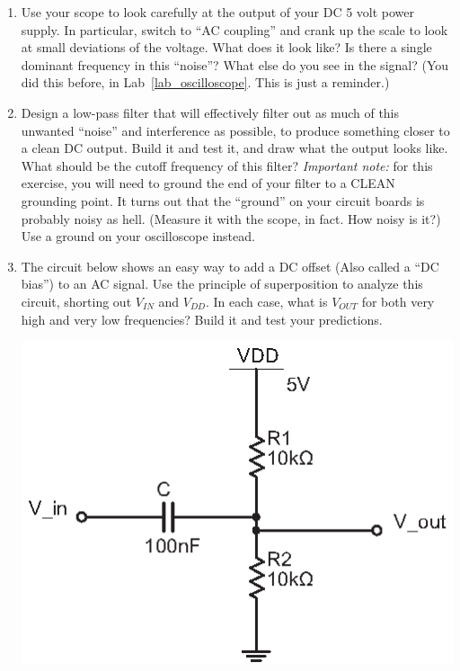 \begin{enumerate}[wide]
\item Use your scope to look carefully at the output of your DC 5 volt power supply.  In particular, switch to ``AC coupling'' and crank up the scale to look at small deviations of the voltage.  What does it look like?  Is there a single dominant frequency in this ``noise''?  What else do you see in the signal?  (You did this before, in Lab~\ref{lab_oscilloscope}.  This is just a reminder.)

\item Design a low-pass filter that will effectively filter out as much of this unwanted ``noise'' and interference as possible, to produce something closer to a clean DC output.  Build it and test it, and draw what the output looks like.  What should be the cutoff frequency of this filter?  \textit{Important note:} for this exercise, you will need to ground the end of your filter to a CLEAN grounding point.  It turns out that the ``ground'' on your circuit boards is probably noisy as hell.  (Measure it with the scope, in fact.  How noisy is it?)  Use a ground on your oscilloscope instead.

\item The circuit below shows an easy way to add a DC offset (Also called a ``DC bias'') to an AC signal.  Use the principle of superposition to analyze this circuit, shorting out $V_{IN}$ and $V_{DD}$.  In each case, what is $V_{OUT}$ for both very high and very low frequencies?  Build it and test your predictions.
\begin{center}
\includegraphics{filters/DC_biasing.eps}
\end{center}


\end{enumerate}
